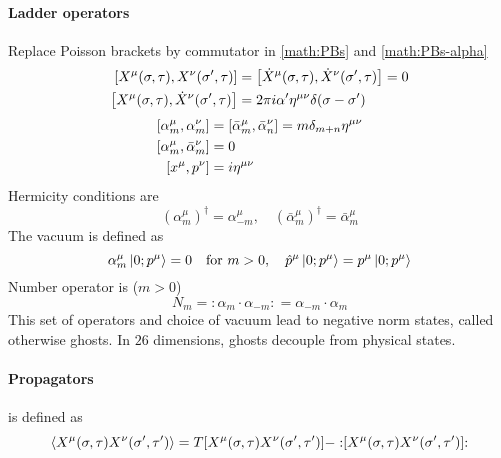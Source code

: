 \documentclass[12pt, a4paper, DIV=15]{article}
\numberwithin{equation}{section}
\newcommand{\normord}[1]{:\mathrel{#1}:}
\begin{document}
\paragraph{Ladder operators}
Replace Poisson brackets by commutator in \eqref{math:PBs} and \eqref{math:PBs-alpha}
\begin{subequations}
\begin{align}
	\comm{X^\mu(\sigma,\tau)}{X^\nu (\sigma',\tau)} &= \comm{\dot{X}^\mu(\sigma,\tau)}{\dot{X}^\nu(\sigma',\tau)} = 0 \\
	\comm{X^\mu(\sigma,\tau)}{\dot{X}^\nu(\sigma',\tau)} &= 2\pi i \alpha' \eta^{\mu\nu} \delta(\sigma - \sigma')
\end{align}
\label{math:PBs}
\end{subequations}
\begin{subequations}
\begin{align}
	\comm{\alpha^\mu_m}{\alpha^\nu_m} &= \comm{\bar{\alpha}^\mu_m}{\bar{\alpha}^\nu_n} = m \delta_{m+n} \eta^{\mu\nu} \\
	\comm{\alpha^\mu_m}{\bar{\alpha}^\nu_m} &= 0 \\
	\comm{x^\mu}{p^\nu} &= i \eta^{\mu\nu}
\end{align}	\label{math:PBs-alpha}
\end{subequations}
Hermicity conditions are 
\begin{equation}
	(\alpha_m^\mu)^\dagger = \alpha^\mu_{-m}, \quad (\bar{\alpha}^\mu_m)^\dagger = \bar{\alpha}^\mu_m
\end{equation}
The vacuum is defined as 
\begin{equation}
	\alpha_m^\mu \ket{0; p^\mu} = 0 \quad \text{for }m > 0, \quad \hat{p}^\mu \ket{0; p^\mu} = p^\mu \ket{0; p^\mu}
\end{equation}
Number operator is ($m > 0$)
\begin{equation}
	N_m = :\alpha_m \cdot \alpha_{-m}: = \alpha_{-m} \cdot \alpha_m
\end{equation}
This set of operators and choice of vacuum lead to negative norm states, called otherwise ghosts. In $26$ dimensions, ghosts decouple from physical states.

\paragraph{Propagators}
is defined as
\begin{equation}
	\expval{X^\mu (\sigma, \tau) X^\nu (\sigma', \tau')} = T[X^\mu (\sigma,\tau) X^\nu (\sigma',\tau')] - \normord{[X^\mu(\sigma,\tau) X^\nu(\sigma',\tau')]}
\end{equation}
\end{document}

